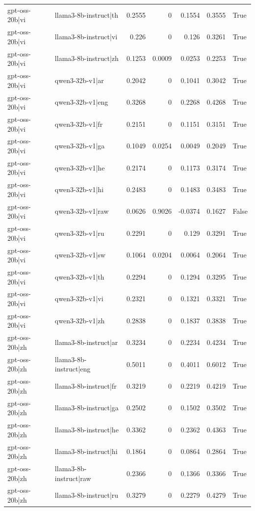 \begin{table}
\begin{tabular}{l l r r r r l}
gpt-oss-20b|vi & llama3-8b-instruct|th & 0.2555 & 0 & 0.1554 & 0.3555 & True \\
gpt-oss-20b|vi & llama3-8b-instruct|vi & 0.226 & 0 & 0.126 & 0.3261 & True \\
gpt-oss-20b|vi & llama3-8b-instruct|zh & 0.1253 & 0.0009 & 0.0253 & 0.2253 & True \\
gpt-oss-20b|vi & qwen3-32b-v1|ar & 0.2042 & 0 & 0.1041 & 0.3042 & True \\
gpt-oss-20b|vi & qwen3-32b-v1|eng & 0.3268 & 0 & 0.2268 & 0.4268 & True \\
gpt-oss-20b|vi & qwen3-32b-v1|fr & 0.2151 & 0 & 0.1151 & 0.3151 & True \\
gpt-oss-20b|vi & qwen3-32b-v1|ga & 0.1049 & 0.0254 & 0.0049 & 0.2049 & True \\
gpt-oss-20b|vi & qwen3-32b-v1|he & 0.2174 & 0 & 0.1173 & 0.3174 & True \\
gpt-oss-20b|vi & qwen3-32b-v1|hi & 0.2483 & 0 & 0.1483 & 0.3483 & True \\
gpt-oss-20b|vi & qwen3-32b-v1|raw & 0.0626 & 0.9026 & -0.0374 & 0.1627 & False \\
gpt-oss-20b|vi & qwen3-32b-v1|ru & 0.2291 & 0 & 0.129 & 0.3291 & True \\
gpt-oss-20b|vi & qwen3-32b-v1|sw & 0.1064 & 0.0204 & 0.0064 & 0.2064 & True \\
gpt-oss-20b|vi & qwen3-32b-v1|th & 0.2294 & 0 & 0.1294 & 0.3295 & True \\
gpt-oss-20b|vi & qwen3-32b-v1|vi & 0.2321 & 0 & 0.1321 & 0.3321 & True \\
gpt-oss-20b|vi & qwen3-32b-v1|zh & 0.2838 & 0 & 0.1837 & 0.3838 & True \\
gpt-oss-20b|zh & llama3-8b-instruct|ar & 0.3234 & 0 & 0.2234 & 0.4234 & True \\
gpt-oss-20b|zh & llama3-8b-instruct|eng & 0.5011 & 0 & 0.4011 & 0.6012 & True \\
gpt-oss-20b|zh & llama3-8b-instruct|fr & 0.3219 & 0 & 0.2219 & 0.4219 & True \\
gpt-oss-20b|zh & llama3-8b-instruct|ga & 0.2502 & 0 & 0.1502 & 0.3502 & True \\
gpt-oss-20b|zh & llama3-8b-instruct|he & 0.3362 & 0 & 0.2362 & 0.4363 & True \\
gpt-oss-20b|zh & llama3-8b-instruct|hi & 0.1864 & 0 & 0.0864 & 0.2864 & True \\
gpt-oss-20b|zh & llama3-8b-instruct|raw & 0.2366 & 0 & 0.1366 & 0.3366 & True \\
gpt-oss-20b|zh & llama3-8b-instruct|ru & 0.3279 & 0 & 0.2279 & 0.4279 & True \\

\end{tabular}
\end{table}
